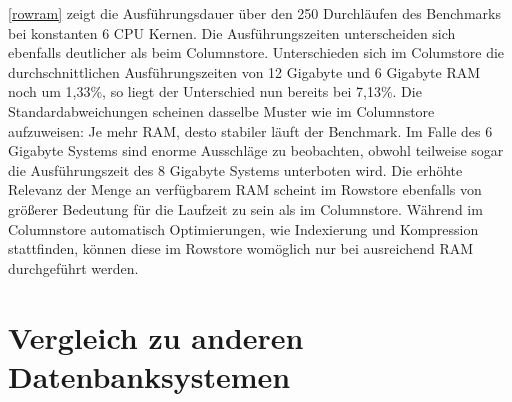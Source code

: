 \begin{figure}[H]
\end{figure}

\autoref{rowram} zeigt die Ausführungsdauer über den 250 Durchläufen des Benchmarks bei konstanten 6 CPU Kernen. Die Ausführungszeiten unterscheiden sich ebenfalls deutlicher als beim Columnstore. Unterschieden sich im Columstore die durchschnittlichen Ausführungszeiten von 12 Gigabyte und 6 Gigabyte RAM noch um 1,33\%, so liegt der Unterschied nun bereits bei 7,13\%. Die Standardabweichungen scheinen dasselbe Muster wie im Columnstore aufzuweisen: Je mehr RAM, desto stabiler läuft der Benchmark. Im Falle des 6 Gigabyte Systems sind enorme Ausschläge zu beobachten, obwohl teilweise sogar die Ausführungszeit des 8 Gigabyte Systems unterboten wird. 
Die erhöhte Relevanz der Menge an verfügbarem RAM scheint im Rowstore ebenfalls von größerer Bedeutung für die Laufzeit zu sein als im Columnstore. Während im Columnstore automatisch Optimierungen, wie Indexierung und Kompression stattfinden, können diese im Rowstore womöglich nur bei ausreichend RAM durchgeführt werden. 

\section{Vergleich zu anderen Datenbanksystemen}\label{auswertung:vergleich}



